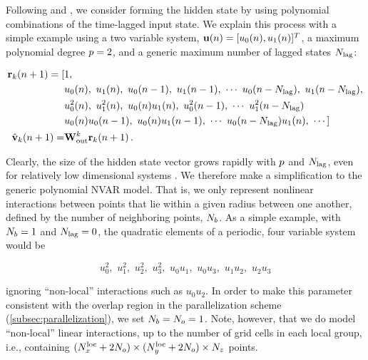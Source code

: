 \documentclass[draft]{agujournal2019}
\newcommand{\citep}{\cite}
\newcommand{\citet}{\citeA}
\begin{document}
Following \citet{gauthier_next_2021} and \citet{chen_next_2022}, we consider forming the hidden state by using polynomial combinations of the time-lagged input state.
We explain this process with a simple example using a two variable system,
$\mathbf{u}(n) = [u_0(n), u_1(n)]^T$,
a maximum polynomial degree
$p=2$, and a generic maximum number of lagged states $N_\text{lag}$:
\begin{linenomath*}\begin{equation}
    \begin{aligned}
        \mathbf{r}_{k}(n+1)
        =
        [&1, \\
         &u_0(n), \,\, u_1(n), \,\,
        u_0(n-1),\,\, u_1(n-1), \,\,
        \cdots \,\,
        u_0(n-N_\text{lag}), \,\, u_1(n-N_\text{lag}), \\
         &u_0^2(n), \,\, u_1^2(n), \,\, u_0(n)u_1(n), \,\,
        u_0^2(n-1), \,\, \cdots \,\, u_1^2(n-N_\text{lag}) \\
         &u_0(n)u_0(n-1), \,\,
        u_0(n)u_1(n-1), \,\, \cdots \,\, u_0(n-N_\text{lag})u_1(n), \,\,\cdots
        ] \\
        \hat{\mathbf{v}}_{k}(n+1) = &\mathbf{W}_\text{out}^{k} \mathbf{r}_{k}(n+1) \, .
    \end{aligned}
\end{equation}\end{linenomath*}
Clearly, the size of the hidden state vector grows rapidly with
$p$ and $N_\text{lag}$,
even for relatively low dimensional systems
\citep<see supplemental material of>[for explicit calculations]{chen_next_2022}.
We therefore make a simplification to the generic polynomial NVAR model.
That is, we only represent nonlinear interactions between points that lie
within a given radius between one another, defined by the number of neighboring
points, $N_{b}$.
As a simple example, with $N_{b}=1$ and $N_\text{lag}=0$, the quadratic elements of a periodic, four variable
system would be
\begin{linenomath*}\begin{equation*}
    u_0^2, \,\, u_1^2, \,\, u_2^2, \,\, u_3^2, \,\,
    u_0u_1, \,\, u_0u_3, \,\, u_1u_2, \,\, u_2u_3
\end{equation*}\end{linenomath*}
ignoring ``non-local'' interactions such as $u_0u_2$.
In order to make this parameter consistent with the overlap region in the parallelization scheme (\cref{subsec:parallelization}),
we set $N_{b} = N_{o} = 1$.
Note, however, that we do model ``non-local'' linear interactions, up to the
number of grid cells in each local group, i.e., containing
$(N_{x}^\text{loc}+2N_{o})\times(N_{y}^\text{loc}+2N_{o})\times N_{z}$ points.
\end{document}
